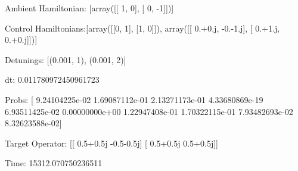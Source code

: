 \documentclass{article}
\begin{document}
    

\newpage

Ambient Hamiltonian: [array([[ 1,  0],
       [ 0, -1]])]

Control Hamiltonians:[array([[0, 1],
       [1, 0]]), array([[ 0.+0.j, -0.-1.j],
       [ 0.+1.j,  0.+0.j]])]

Detunings: [(0.001, 1), (0.001, 2)]

 dt: 0.011780972450961723

Probs: [  9.24104225e-02   1.69087112e-01   2.13271173e-01   4.33680869e-19
   6.93511425e-02   0.00000000e+00   1.22947408e-01   1.70322115e-01
   7.93482693e-02   8.32623588e-02]

Target Operator: [[ 0.5+0.5j -0.5-0.5j]
 [ 0.5+0.5j  0.5+0.5j]]

Time: 15312.070750236511
\end{document}
